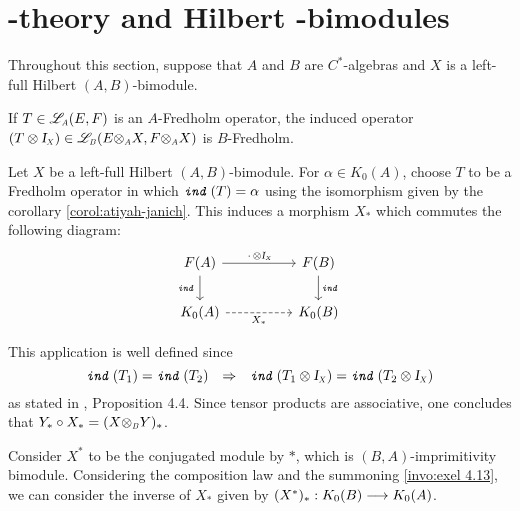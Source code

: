\section[\texorpdfstring{\ensuremath{K}}{K}-theory and Hilbert \texorpdfstring{\ensuremath{C^*}}{C*}-bimodules]{\texorpdfstring{}{K}-theory and Hilbert \texorpdfstring{}{C*}-bimodules}

Throughout this section, suppose that $A$ and $B$ are $C^*$-algebras and $X$ is a left-full Hilbert $(A,B)$-bimodule.

\begin{invocacao}
	\label{invocacao:exel 4.3}
	If $T\in \sub\adj{A}(E,F)$ is an $A$-Fredholm operator, the induced operator $(T\otimes \sub\Id{X})\in \sub\adj{B}(E\sub\otimes{A} X, F\sub\otimes A X)$ is $B$-Fredholm.
\end{invocacao}

\begin{definicao}
	Let $X$ be a left-full Hilbert $(A,B)$-bimodule. For $\alpha\in K_0(A)$, choose $T$ to be a Fredholm operator in which $\texttt{\textit{ind}}\,(T)=\alpha$ using the isomorphism given by the corollary \ref{corol:atiyah-janich}. This induces a morphism $X_*$ which commutes the following diagram:
	\begin{equation*}
		\begin{tikzcd}
		F(A) \arrow[d, "\ind"'] \arrow[rr, "\,\cdot\, \otimes \sub\Id X"] &  & F(B) \arrow[d, "\ind"] \\
		K_0(A) \arrow[rr, "X_*"', dashed]                            &  & K_0(B)                
		\end{tikzcd}
	\end{equation*}
\end{definicao}

This application is well defined since 
\begin{equation*}
	\ind(T_1)=\ind(T_2) \To \ind(T_1\otimes \sub\Id{X}) = \ind(T_2\otimes \sub\Id{X})
\end{equation*}
as stated in \cite{exel7fredholm}, Proposition 4.4. Since tensor products are associative, one concludes that $Y_* \circ X_* = (X \sub\otimes B Y)_*$. 

Consider $X^*$ to be the conjugated module by $*$, which is $(B,A)$-imprimitivity bimodule. Considering the composition law and the summoning \ref{invo:exel 4.13}, we can consider the inverse of $X_*$ given by $(X^*)_*: K_0(B) \longrightarrow K_0(A)$. 

